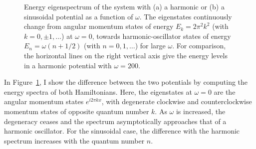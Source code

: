 \begin{figure}
\centering
{}

\caption{ Energy eigenspectrum of the system with (a) a harmonic or (b) a sinusoidal potential as a function of $\omega$. 
The eigenstates continuously change from angular momentum states of energy $E_k=2\pi^2 k^2$ (with $k=0,\pm1,\ldots$) at $\omega=0$, towards harmonic-oscillator states of energy $E_n=\omega(n+1/2)$ (with $n=0,1,\ldots$) for large $\omega$.
For comparison, the horizontal lines on the right vertical axis give the energy levels in a harmonic potential with $\omega=200$.}
\label{fig:spectrum}
\end{figure}

In Figure~\ref{fig:spectrum}, I show the difference between the two potentials by computing the energy spectra of both Hamiltonians.
Here, the eigenstates at $\omega=0$ are the angular momentum states $e^{i 2 \pi k x}$, with degenerate clockwise and counterclockwise momentum states of opposite quantum number $k$.
As $\omega$ is increased, the degeneracy ceases and the spectrum asymptotically approaches that of a harmonic oscillator.
For the sinusoidal case, the difference with the harmonic spectrum increases with the quantum number $n$.

